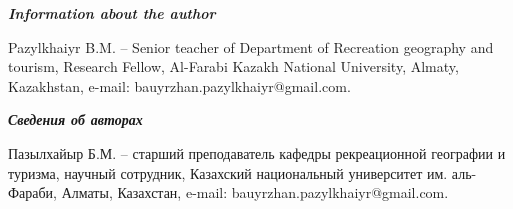 \emph{{\bfseries Information about the author}}

Pazylkhaiyr B.M. -- Senior teacher of Department of Recreation geography
and tourism, Research Fellow, Al-Farabi Kazakh National University,
Almaty, Kazakhstan, e-mail: bauyrzhan.pazylkhaiyr@gmail.com.

\emph{{\bfseries Сведения об авторах}}

Пазылхайыр Б.М. -- старший преподаватель кафедры рекреационной географии
и туризма, научный сотрудник, Казахский национальный университет им.
аль-Фараби, Алматы, Казахстан, e-mail: bauyrzhan.pazylkhaiyr@gmail.com.

